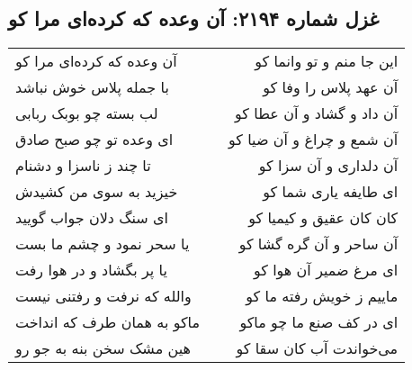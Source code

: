 \begin{center}
\section*{غزل شماره ۲۱۹۴: آن وعده که کرده‌ای مرا کو}
\label{sec:2194}
\begin{longtable}{l p{0.5cm} r}
آن وعده که کرده‌ای مرا کو
&&
این جا منم و تو وانما کو
\\
با جمله پلاس خوش نباشد
&&
آن عهد پلاس را وفا کو
\\
لب بسته چو بوبک ربابی
&&
آن داد و گشاد و آن عطا کو
\\
ای وعده تو چو صبح صادق
&&
آن شمع و چراغ و آن ضیا کو
\\
تا چند ز ناسزا و دشنام
&&
آن دلداری و آن سزا کو
\\
خیزید به سوی من کشیدش
&&
ای طایفه یاری شما کو
\\
ای سنگ دلان جواب گویید
&&
کان کان عقیق و کیمیا کو
\\
یا سحر نمود و چشم ما بست
&&
آن ساحر و آن گره گشا کو
\\
یا پر بگشاد و در هوا رفت
&&
ای مرغ ضمیر آن هوا کو
\\
والله که نرفت و رفتنی نیست
&&
ماییم ز خویش رفته ما کو
\\
ماکو به همان طرف که انداخت
&&
ای در کف صنع ما چو ماکو
\\
هین مشک سخن بنه به جو رو
&&
می‌خواندت آب کان سقا کو
\\
\end{longtable}
\end{center}

